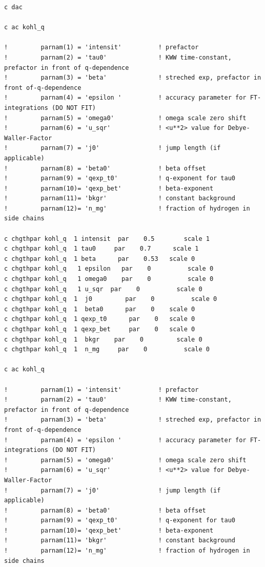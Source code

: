 \documentclass[11pt,fleqn]{book} %
\begin{document}
\begin{verbatim}
c dac

c ac kohl_q

! 		  parnam(1) = 'intensit'          ! prefactor
!         parnam(2) = 'tau0'              ! KWW time-constant, prefactor in front of q-dependence
!         parnam(3) = 'beta'              ! streched exp, prefactor in front of-q-dependence
!         parnam(4) = 'epsilon '          ! accuracy parameter for FT-integrations (DO NOT FIT)
!         parnam(5) = 'omega0'            ! omega scale zero shift
!         parnam(6) = 'u_sqr'             ! <u**2> value for Debye-Waller-Factor
!         parnam(7) = 'j0'                ! jump length (if applicable)
!         parnam(8) = 'beta0'             ! beta offset
!         parnam(9) = 'qexp_t0'           ! q-exponent for tau0
!         parnam(10)= 'qexp_bet'          ! beta-exponent 
!         parnam(11)= 'bkgr'              ! constant background 
!     	  parnam(12)= 'n_mg'              ! fraction of hydrogen in side chains

c chgthpar kohl_q  1 intensit  par    0.5        scale 1      
c chgthpar kohl_q  1 tau0     par    0.7      scale 1
c chgthpar kohl_q  1 beta      par    0.53 	 scale 0
c chgthpar kohl_q   1 epsilon   par    0          scale 0
c chgthpar kohl_q   1 omega0    par    0          scale 0
c chgthpar kohl_q   1 u_sqr  par    0          scale 0
c chgthpar kohl_q  1  j0         par    0          scale 0
c chgthpar kohl_q  1  beta0      par    0 	 scale 0
c chgthpar kohl_q  1 qexp_t0      par    0 	 scale 0
c chgthpar kohl_q  1 qexp_bet     par    0 	 scale 0
c chgthpar kohl_q  1  bkgr    par    0         scale 0
c chgthpar kohl_q  1  n_mg     par    0          scale 0

c ac kohl_q

! 		  parnam(1) = 'intensit'          ! prefactor
!         parnam(2) = 'tau0'              ! KWW time-constant, prefactor in front of q-dependence
!         parnam(3) = 'beta'              ! streched exp, prefactor in front of-q-dependence
!         parnam(4) = 'epsilon '          ! accuracy parameter for FT-integrations (DO NOT FIT)
!         parnam(5) = 'omega0'            ! omega scale zero shift
!         parnam(6) = 'u_sqr'             ! <u**2> value for Debye-Waller-Factor
!         parnam(7) = 'j0'                ! jump length (if applicable)
!         parnam(8) = 'beta0'             ! beta offset
!         parnam(9) = 'qexp_t0'           ! q-exponent for tau0
!         parnam(10)= 'qexp_bet'          ! beta-exponent 
!         parnam(11)= 'bkgr'              ! constant background 
!     	  parnam(12)= 'n_mg'              ! fraction of hydrogen in side chains


\end{verbatim}
\end{document}
